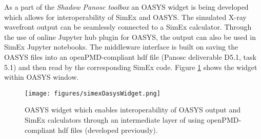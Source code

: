 \documentclass[10pt]{scrartcl}
\begin{document}
As a part of the \emph{Shadow Panosc toolbox} an OASYS widget is being developed which allows for interoperability of SimEx and OASYS. The simulated X-ray wavefront output can be seamlessly connected to a SimEx calculator. Through the use of online Jupyter hub plugin for OASYS, the output can also be used in SimEx Jupyter notebooks. The middleware interface is built on saving the OASYS files into an openPMD-compliant hdf file (Panosc deliverable D5.1, task 5.1) and then read by the corresponding SimEx code. Figure \ref{fig:simex_oasys_widget} shows the widget within OASYS window.

\begin{figure}[htb]
    \centering
    \texttt{[image: figures/simexOasysWidget.png]}
    \caption{OASYS widget which enables interoperability of OASYS output and SimEx calculators through an intermediate layer of using openPMD-compliant hdf files (developed previously).}
    \label{fig:simex_oasys_widget}
\end{figure}
\end{document}
